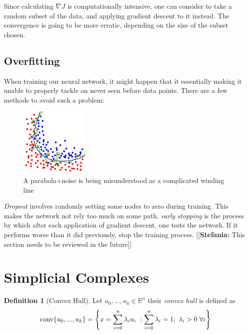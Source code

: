 \documentclass{article}
\newcommand{\R}{\mathbb{R}}
\newcommand{\conv}{\textmd{conv}}
\newcommand{\ste}[1]{{\color{green}[[\textbf{Stefania: }#1]]}}
\theoremstyle{plain}
\theoremstyle{definition}
\newtheorem{definition}{Definition}[section]
\theoremstyle{remark}
\begin{document}
	Since calculating $\nabla J$ is computationally intensive, one can consider to take a random subset of the data, and applying gradient descent to it instead. The convergence is going to be more erratic, depending on the size of the subset chosen.
	\subsection{Overfitting}
	When training our neural network, it might happen that it essentially  making it unable to properly tackle on never seen before data points. There are a few methods to avoid such a problem:
		\begin{figure}[ht!]
		\centering
		\includegraphics{overfitting.png}
		\caption[image of overfitting]{A parabola+noise is being misunderstood as a complicated winding line \protect \footnotemark}
		\end{figure}
		
	\emph{Dropout} involves randomly setting some nodes to zero during training. This makes the network not rely too much on some path.
	\emph{early stopping} is the process by which after each application of gradient descent, one tests the network. If it performs worse than it did previously, stop the training process.	
	\ste{This section needs to be reviewed in the future}
	\section{Simplicial Complexes}
	\begin{definition}[Convex Hull]
	Let $ u_0,...,u_k \in \R^n $ their \emph{convex hull} is defined as
	  \begin{equation} 
	  \label{conv-hull}
	  \conv \{u_0,...,u_k\} = \left\{ x= \sum_{i=0}^{n} \lambda_i u_i \ :    \sum_{i=0}^{n} \lambda_i = 1; \ \lambda_i > 0 \ \forall i \right\} 
	  \end{equation}
	\end{definition}
	
\end{document}

